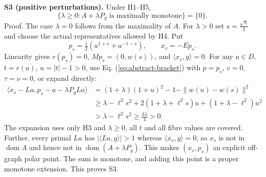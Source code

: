 \documentclass[11pt,a4paper]{article}
\begin{document}
\textbf{S3 (positive perturbations).} Under H1--H5,
\[
\{\lambda\ge0:A+\lambda P_g\text{ is maximally monotone}\}=\{0\}.
\tag{S3}
\]
Proof. The case $\lambda=0$ follows from the maximality of $A$. For $\lambda>0$ set $s=\frac{\sqrt{\lambda}}{2}$ and choose the actual representatives allowed by H4. Put
\[
p_s=\tfrac12(a^{1+s}+a^{-1-s}),\qquad x_s=-Ep_s.
\tag{S4}
\]
Linearity gives $r(p_s)=0$, $Mp_s=(0,w(s))$, and $\langle x_s,g\rangle=0$. For any $a\in D$, $t=r(a)$, $u=|t|-1>0$, use Eq. (\ref{eq:abstract-bracket}) with $p=p_s$, $v=0$, $\tau=\nu=0$, or expand directly:
\[
\begin{aligned}
\langle x_s-La,p_s-a-\lambda P_gLa\rangle
 &=(1+\lambda)(1+u)^2-1-\|w(u)-w(s)\|^2\\
 &\ge\lambda-\ell^2s^2
     +2(1+\lambda+\ell^2s)u+(1+\lambda-\ell^2)u^2\\
 &>\lambda-\ell^2s^2\ge\frac{3\lambda}{4}>0.
\end{aligned}
\tag{S5}
\]
The expansion uses only H3 and $\lambda\ge0$, all $t$ and all fibre values are covered. Further, every primal $La$ has $|\langle La,g\rangle|>1$ whereas $\langle x_s,g\rangle=0$, so $x_s$ is not in $\operatorname{dom}A$ and hence not in $\operatorname{dom}(A+\lambda P_g)$. This makes $(x_s,p_s)$ an explicit off-graph polar point. The sum is monotone, and adding this point is a proper monotone extension. This proves S3.
\end{document}
